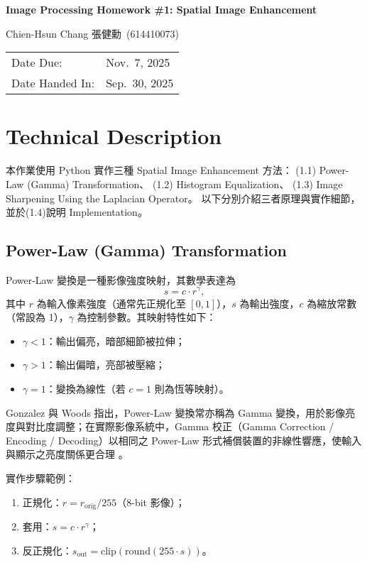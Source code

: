 \documentclass[12pt,a4paper]{article}
\newcommand{\HomeworkTitle}{Image Processing Homework \#1: Spatial Image Enhancement}
\newcommand{\StudentName}{Chien-Hsun Chang 張健勳}
\newcommand{\StudentID}{614410073}
\newcommand{\StudentInfo}{\StudentName~(\StudentID)}
\newcommand{\DateDue}{Nov.\ 7, 2025}
\newcommand{\DateHandedIn}{Sep.\ 30, 2025}
\begin{document}
\begin{titlepage}
  \centering
  {\vspace*{2cm}\Huge\bfseries \HomeworkTitle\par}
  \vspace{2cm}
  {\Large \StudentInfo\par}
  \vfill
  \begin{tabular}{@{}ll@{}}
    Date Due: & \DateDue \\
    Date Handed In: & \DateHandedIn \\
  \end{tabular}
  \vfill
\end{titlepage}

\section{Technical Description}
本作業使用 Python 實作三種 Spatial Image Enhancement 方法：
(1.1) Power-Law (Gamma) Transformation、
(1.2) Histogram Equalization、
(1.3) Image Sharpening Using the Laplacian Operator。
以下分別介紹三者原理與實作細節，並於(1.4)說明 Implementation。

\subsection{Power-Law (Gamma) Transformation}
Power-Law 變換是一種影像強度映射，其數學表達為
\[
s = c \cdot r^{\gamma},
\]
其中 \(r\) 為輸入像素強度（通常先正規化至 \([0,1]\)），\(s\) 為輸出強度，\(c\) 為縮放常數（常設為 1），\(\gamma\) 為控制參數。其映射特性如下：
\begin{itemize}
  \item \(\gamma < 1\)：輸出偏亮，暗部細節被拉伸；
  \item \(\gamma > 1\)：輸出偏暗，亮部被壓縮；
  \item \(\gamma = 1\)：變換為線性（若 \(c=1\) 則為恆等映射）。
\end{itemize}

Gonzalez 與 Woods 指出，Power-Law 變換常亦稱為 Gamma 變換，用於影像亮度與對比度調整；在實際影像系統中，Gamma 校正（Gamma Correction / Encoding / Decoding）以相同之 Power-Law 形式補償裝置的非線性響應，使輸入與顯示之亮度關係更合理 \cite{GonzalezWoods2018}。

實作步驟範例：
\begin{enumerate}
  \item 正規化：\( r = r_{\text{orig}}/255 \)（8-bit 影像）；
  \item 套用：\( s = c \cdot r^{\gamma} \)；
  \item 反正規化：\( s_{\text{out}} = \mathrm{clip}(\mathrm{round}(255 \cdot s)) \)。
\end{enumerate}
\end{document}
